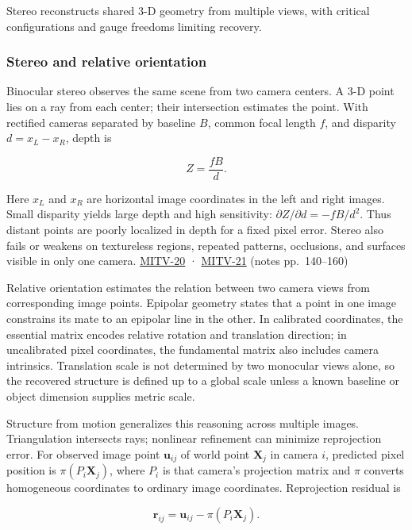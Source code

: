 Stereo reconstructs shared 3-D geometry from multiple views, with critical configurations and gauge freedoms limiting recovery.

\subsubsection{Stereo and relative orientation}\label{stereo-and-relative-orientation}

Binocular stereo observes the same scene from two camera centers. A 3-D point lies on a ray from each center; their intersection estimates the point. With rectified cameras separated by baseline \(B\), common focal length \(f\), and disparity \(d=x_L-x_R\), depth is

\[
Z=\frac{fB}{d}.
\]

Here \(x_L\) and \(x_R\) are horizontal image coordinates in the left and right images. Small disparity yields large depth and high sensitivity: \(\partial Z/\partial d=-fB/d^2\). Thus distant points are poorly localized in depth for a fixed pixel error. Stereo also fails or weakens on textureless regions, repeated patterns, occlusions, and surfaces visible in only one camera. \hyperref[04-visual-computing-ii-ch036]{MITV-20} · \hyperref[04-visual-computing-ii-ch036]{MITV-21} (notes pp.~140--160)

Relative orientation estimates the relation between two camera views from corresponding image points. Epipolar geometry states that a point in one image constrains its mate to an epipolar line in the other. In calibrated coordinates, the essential matrix encodes relative rotation and translation direction; in uncalibrated pixel coordinates, the fundamental matrix also includes camera intrinsics. Translation scale is not determined by two monocular views alone, so the recovered structure is defined up to a global scale unless a known baseline or object dimension supplies metric scale.

Structure from motion generalizes this reasoning across multiple images. Triangulation intersects rays; nonlinear refinement can minimize reprojection error. For observed image point \(\mathbf{u}_{ij}\) of world point \(\mathbf{X}_j\) in camera \(i\), predicted pixel position is \(\pi(P_i\mathbf{X}_j)\), where \(P_i\) is that camera's projection matrix and \(\pi\) converts homogeneous coordinates to ordinary image coordinates. Reprojection residual is

\[
\mathbf{r}_{ij}=\mathbf{u}_{ij}-\pi(P_i\mathbf{X}_j).
\]

